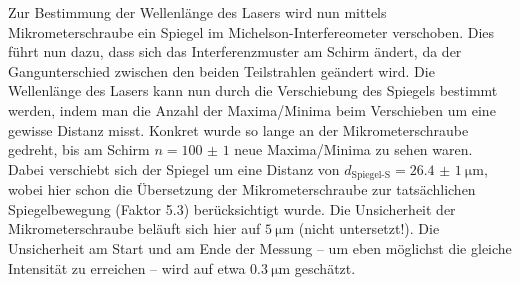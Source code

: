 \documentclass[ngerman]{scrartcl}
\begin{document}
\setcaphanging
%
Zur Bestimmung der Wellenlänge des Lasers wird nun mittels Mikrometerschraube ein Spiegel im Michelson-Interfereometer verschoben. Dies führt nun dazu, dass sich das Interferenzmuster am Schirm ändert, da der Gangunterschied zwischen den beiden Teilstrahlen geändert wird. Die Wellenlänge des Lasers kann nun durch die Verschiebung des Spiegels bestimmt werden, indem man die Anzahl der Maxima/Minima beim Verschieben um eine gewisse Distanz misst. Konkret wurde so lange an der Mikrometerschraube gedreht, bis am Schirm $n = \num{100(1)}$ neue Maxima/Minima zu sehen waren. Dabei verschiebt sich der Spiegel um eine Distanz von $d_\text{Spiegel-S} = \SI{26.4(10)}{\micro\meter}$, wobei hier schon die Übersetzung der Mikrometerschraube zur tatsächlichen Spiegelbewegung (Faktor \num{5.3}) berücksichtigt wurde. Die Unsicherheit der Mikrometerschraube beläuft sich hier auf $\SI{5}{\micro\meter}$ (nicht untersetzt!). Die Unsicherheit am Start und am Ende der Messung -- um eben möglichst die gleiche Intensität zu erreichen -- wird auf etwa $\SI{0.3}{\micro\meter}$ geschätzt.
\end{document}
